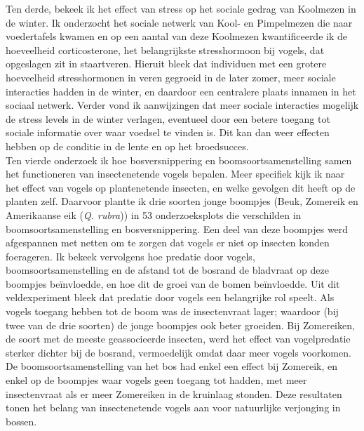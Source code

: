 \documentclass[10pt, twoside]{book} %
\begin{document}
Ten derde, bekeek ik het effect van stress op het sociale gedrag van Koolmezen in de winter. Ik onderzocht het sociale netwerk van Kool- en Pimpelmezen die naar voedertafels kwamen en op een aantal van deze Koolmezen kwantificeerde ik de hoeveelheid corticosterone, het belangrijkste stresshormoon bij vogels, dat opgeslagen zit in staartveren. Hieruit bleek dat individuen met een grotere hoeveelheid stresshormonen in veren gegroeid in de later zomer, meer sociale interacties hadden in de winter, en daardoor een centralere plaats innamen in het sociaal netwerk. Verder vond ik aanwijzingen dat meer sociale interacties mogelijk de stress levels in de winter verlagen, eventueel door een betere toegang tot sociale informatie over waar voedsel te vinden is. Dit kan dan weer effecten hebben op de conditie in de lente en op het broedsucces.\\
 
Ten vierde onderzoek ik hoe bosversnippering en boomsoortsamenstelling samen het functioneren van insectenetende vogels bepalen. Meer specifiek kijk ik naar het effect van vogels op plantenetende insecten, en welke gevolgen dit heeft op de planten zelf. Daarvoor plantte ik drie soorten jonge boompjes (Beuk, Zomereik en Amerikaanse eik (\textit{Q. rubra})) in 53 onderzoeksplots die verschilden in boomsoortsamenstelling en bosversnippering. Een deel van deze boompjes werd afgespannen met netten om te zorgen dat vogels er niet op insecten konden foerageren. Ik bekeek vervolgens hoe predatie door vogels, boomsoortsamenstelling en de afstand tot de bosrand de bladvraat op deze boompjes be\"{i}nvloedde, en hoe dit de groei van de bomen be\"{i}nvloedde. Uit dit veldexperiment bleek dat predatie door vogels een belangrijke rol speelt. Als vogels toegang hebben tot de boom was de insectenvraat lager; waardoor (bij twee van de drie soorten) de jonge boompjes ook beter groeiden. Bij Zomereiken, de soort met de meeste geassocieerde insecten, werd het effect van vogelpredatie sterker dichter bij de bosrand, vermoedelijk omdat daar meer vogels voorkomen. De boomsoortsamenstelling van het bos had enkel een effect bij Zomereik, en enkel op de boompjes waar vogels geen toegang tot hadden, met meer insectenvraat als er meer Zomereiken in de kruinlaag stonden. Deze resultaten tonen het belang van insectenetende vogels aan voor natuurlijke verjonging in bossen.\\
\end{document}
